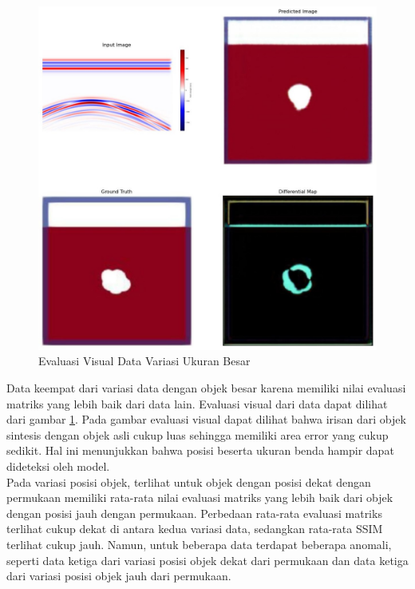 \begin{figure}[ht]
  \centering
  \includegraphics[scale=0.15]{gambar/diffMapBesar.jpg}
  \caption{Evaluasi Visual Data Variasi Ukuran Besar}
  \label{fig:diffmapbesar}
\end{figure}

Data keempat dari variasi data dengan objek besar karena memiliki nilai evaluasi matriks yang lebih baik dari data lain. 
Evaluasi visual dari data dapat dilihat dari gambar \ref{fig:diffmapbesar}. 
Pada gambar evaluasi visual dapat dilihat bahwa irisan dari objek sintesis dengan objek asli cukup luas sehingga memiliki area error yang cukup sedikit. 
Hal ini menunjukkan bahwa posisi beserta ukuran benda hampir dapat dideteksi oleh model. \\

Pada variasi posisi objek, terlihat untuk objek dengan posisi dekat dengan permukaan memiliki rata-rata nilai evaluasi matriks yang lebih baik dari objek dengan posisi jauh dengan permukaan. 
Perbedaan rata-rata evaluasi matriks terlihat cukup dekat di antara kedua variasi data, sedangkan rata-rata SSIM terlihat cukup jauh. 
Namun, untuk beberapa data terdapat beberapa anomali, seperti data ketiga dari variasi posisi objek dekat dari permukaan dan data ketiga dari variasi posisi objek jauh dari permukaan. 

